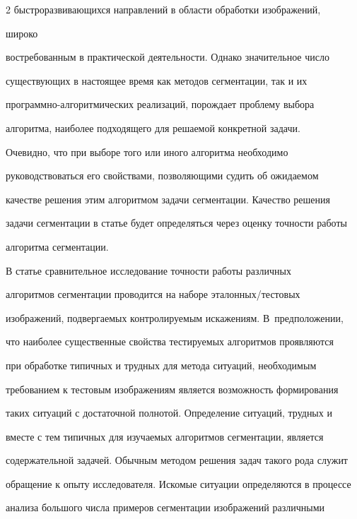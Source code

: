 \begin{multicols}{2}
быстроразвивающихся направлений в области обработки изображений,\linebreak


широко 


востребованным в практической деятель\-ности. Однако значительное число 


существующих в настоящее время как методов сегментации, так и их 


программно-алгоритмических реализаций, порождает проблему выбора 


алгоритма, наиболее подходящего для решаемой конкретной задачи.


  


  Очевидно, что при выборе того или иного алгоритма необходимо 


руководствоваться его свойствами, позволяющими судить об ожидаемом 


качестве решения этим алгоритмом задачи сегментации. Качество решения 


задачи сегментации в статье будет определяться через оценку точности работы 


алгоритма сегментации.


  


  В статье сравнительное исследование точности работы различных 


алгоритмов сегментации проводится на наборе эта\-лон\-ных/тес\-то\-вых 


изображений, подвергаемых контролируемым искажениям. В~предположении, 


что наиболее существенные свойства тестируемых алгоритмов проявляются 


при обработке типичных и трудных для метода ситуаций, необходимым 


требованием к тестовым изоб\-ра\-же\-ни\-ям является возможность формирования\linebreak 


таких ситуаций с достаточной полнотой. Определение ситуаций, трудных и 


вместе с тем типичных для изучаемых алгоритмов сегментации, является 


содержательной задачей. Обычным методом решения задач такого рода служит 


обращение к опыту исследователя. Искомые ситуации определяются в процессе 


анализа большого числа примеров сегментации изображений различными 



\end{multicols}
